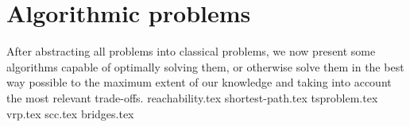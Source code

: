 \chapter{Algorithmic problems} \label{algorithm}
After abstracting all problems into classical problems, we now present some algorithms capable of optimally solving them, or otherwise solve them in the best way possible to the maximum extent of our knowledge and taking into account the most relevant trade-offs.
{reachability.tex}
{shortest-path.tex}
{tsproblem.tex}
{vrp.tex}
{scc.tex}
{bridges.tex}
